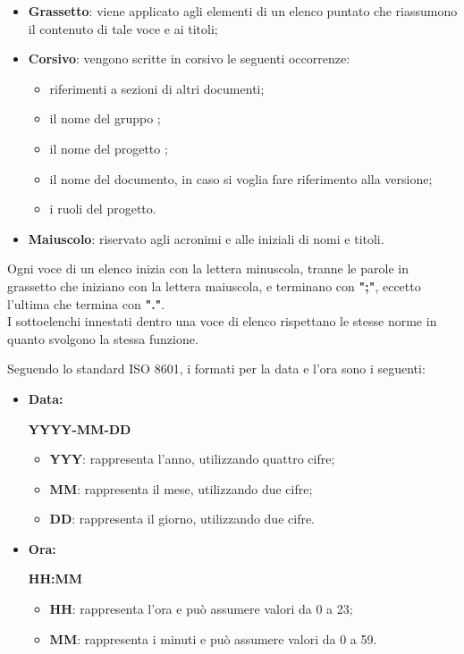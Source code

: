 \vspace{-0.5cm}
\begin{itemize}
	\item \textbf{Grassetto}: viene applicato agli elementi di un elenco puntato che riassumono il contenuto di tale voce e ai titoli;
	\item \textbf{Corsivo}: vengono scritte in corsivo le seguenti occorrenze:
	\begin{itemize}
		\item riferimenti a sezioni di altri documenti;
		\item il nome del gruppo \Omicron ;
		\item il nome del progetto \nameproject ;
		\item il nome del documento, in caso si voglia fare riferimento alla versione;
		\item i ruoli del progetto.
	\end{itemize}
	\item \textbf{Maiuscolo}: riservato agli acronimi e alle iniziali di nomi e titoli.
\end{itemize}

Ogni voce di un elenco inizia con la lettera minuscola, tranne le parole in grassetto che iniziano con la lettera maiuscola, e terminano con \textbf{";"}, eccetto l'ultima che termina con \textbf{"."}. \\
I sottoelenchi innestati dentro una voce di elenco rispettano le stesse norme in quanto svolgono la stessa funzione.

Seguendo lo standard ISO 8601, i formati per la data e l'ora sono i seguenti:
\begin{itemize}
	\item \textbf{Data:}
		\begin{center}
			\textbf{YYYY-MM-DD}
		\end{center}
		\begin{itemize}
			\item \textbf{YYY}: rappresenta l'anno, utilizzando quattro cifre;
			\item \textbf{MM}: rappresenta il mese, utilizzando due cifre;
			\item \textbf{DD}: rappresenta il giorno, utilizzando due cifre.
		\end{itemize}
	\item \textbf{Ora:}
		\begin{center}
			\textbf{HH:MM}
		\end{center}
		\begin{itemize}
			\item \textbf{HH}: rappresenta l'ora e può assumere valori da 0 a 23;
			\item \textbf{MM}: rappresenta i minuti e può assumere valori da 0 a 59.
		\end{itemize}
\end{itemize}